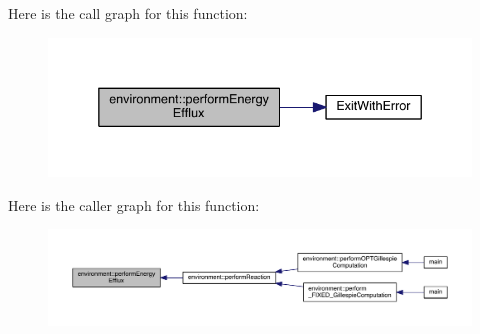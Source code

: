 Here is the call graph for this function\+:\nopagebreak
\begin{figure}[H]
\begin{center}
\leavevmode
\includegraphics[width=336pt]{a00013_aff7607e0f3a74790109a7d87de3031bd_cgraph}
\end{center}
\end{figure}




Here is the caller graph for this function\+:\nopagebreak
\begin{figure}[H]
\begin{center}
\leavevmode
\includegraphics[width=350pt]{a00013_aff7607e0f3a74790109a7d87de3031bd_icgraph}
\end{center}
\end{figure}


